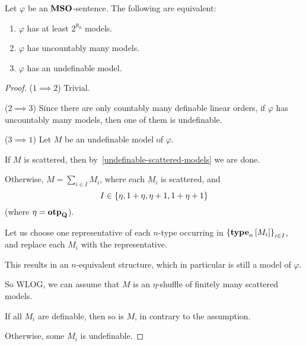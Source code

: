 \begin{theorem}\label{undefinable-models}
    Let $\varphi$ be an $\mathbf{MSO}$-sentence. The following are equivalent:
    \begin{enumerate}
        \item $\varphi$ has at least $2^{\aleph_0}$ models.
        \item $\varphi$ has uncountably many models.
        \item $\varphi$ has an undefinable model.
    \end{enumerate}
\end{theorem}

\begin{proof}
    ($1 \implies 2$) Trivial.

    ($2 \implies 3$) Since there are only countably many
    definable linear orders,
    if $\varphi$ has uncountably many models,
    then one of them is undefinable.

    ($3 \implies 1$)
    Let $M$ be an undefinable model of $\varphi$.

    If $M$ is scattered, then by~\cref{undefinable-scattered-models}
    we are done.

    Otherwise, $M = \sum_{i \in I} M_i$,
    where each $M_i$ is scattered, and
    \[I \in \left\{ {\eta, 1 + \eta, \eta + 1, 1 + \eta + 1} \right\}\]
    (where $\eta = \mathbf{otp}_{\mathbf{Q}}$).
    
    Let us choose one representative of each $n$-type occurring
    in $\left\{ {\mathbf{type}_{n} \left[ {M_i} \right]} \right\}_{i \in I}$, and replace
    each $M_i$ with the representative.
    
    This results in an $n$-equivalent
    structure, which in particular is still a model of $\varphi$.

    So WLOG, we can assume that $M$ is an $\eta$-shuffle of
    finitely many scattered models.

    If all $M_i$ are definable, then so is $M$, in contrary to the assumption.

    Otherwise, some $M_i$ is undefinable.
\end{proof}